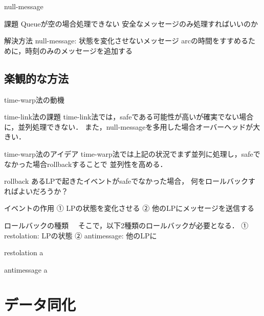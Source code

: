 \documentclass[dvipdfmx,uplatex,11pt]{beamer}
\theoremstyle{definition}
\begin{document}
\begin{frame}{null-message}
  \begin{block}{課題}
   Queueが空の場合処理できない
  安全なメッセージのみ処理すればいいのか
  \end{block}
  \begin{block}{解決方法}
  null-message: 状態を変化させないメッセージ
  arcの時間をすすめるために，時刻のみのメッセージを追加する
  \end{block}
\end{frame}

\subsection{楽観的な方法}
\begin{frame}{time-warp法の動機}
  \begin{block}{time-link法の課題}
  time-link法では，safeである可能性が高いが確実でない場合に，並列処理できない．
  また，null-messageを多用した場合オーバーヘッドが大きい．
  \end{block}
  \begin{block}{time-warp法のアイデア}
  time-warp法では上記の状況でまず並列に処理し，safeでなかった場合rollbackすることで
  並列性を高める．
  \end{block}
\end{frame}

\begin{frame}{rollback}
  あるLPで起きたイベントがsafeでなかった場合，
  何をロールバックすればよいだろうか？
  \begin{block}{イベントの作用}
  ① LPの状態を変化させる
  ② 他のLPにメッセージを送信する
  \end{block}
  \begin{block}{ロールバックの種類}
　そこで，以下2種類のロールバックが必要となる．
  ①  restolation:  LPの状態
  ②  antimessage:  他のLPに
  \end{block}
\end{frame}

\begin{frame}{restolation}
  a
\end{frame}

\begin{frame}{antimessage}
  a
\end{frame}

\section{データ同化}
\end{document}
